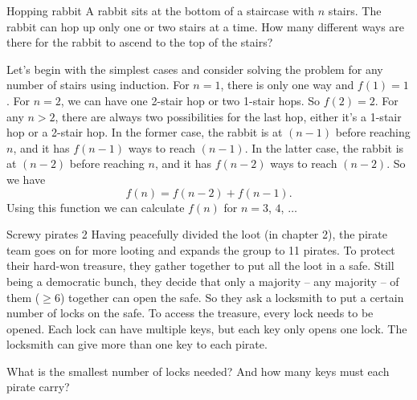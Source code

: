 \begin{problem}{Hopping rabbit}
A rabbit sits at the bottom of a staircase with $n$ stairs. The rabbit can hop up only one
or two stairs at a time. How many different ways are there for the rabbit to ascend to the
top of the stairs?\footnotemark[5]

\end{problem}

\begin{solution}
Let's begin with the simplest cases and consider solving the problem for any number of
stairs using induction. For $n=1$, there is only one way and $f(1)=1$. For $n=2$, we can
have one 2-stair hop or two 1-stair hops. So $f(2)=2$. For any $n>2$, there are always two
possibilities for the last hop, either it's a 1-stair hop or a 2-stair hop. In the former
case, the rabbit is at $(n-1)$ before reaching $n$, and it has $f(n-1)$ ways to reach
$(n-1)$. In the latter case, the rabbit is at $(n-2)$ before reaching $n$, and it has
$f(n-2)$ ways to reach $(n-2)$. So we have
\[
f(n)=f(n-2)+f(n-1).
\]
Using this function we
can calculate $f(n)$ for $n=3$, $4$, $\ldots$\footnotemark[6]
\end{solution}


\begin{problem}{Screwy pirates 2}
Having peacefully divided the loot (in chapter 2), the pirate team goes on for more
looting and expands the group to 11 pirates. To protect their hard-won treasure, they
gather together to put all the loot in a safe. Still being a democratic bunch, they decide
that only a majority -- any majority -- of them ($\geq6$) together can open the safe. So
they ask a locksmith to put a certain number of locks on the safe. To access the treasure,
every lock needs to be opened. Each lock can have multiple keys, but each key only opens
one lock. The locksmith can give more than one key to each pirate.

What is the smallest number of locks needed? And how many keys must each pirate carry?
\footnotemark[7]
\end{problem}

